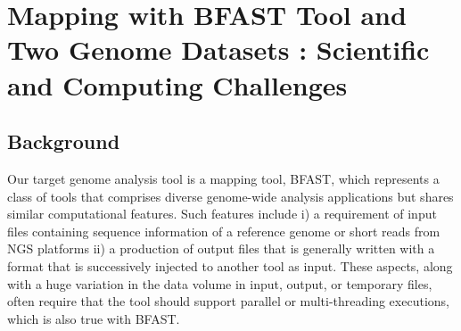 \documentclass[12pt]{article}
\begin{document}


\section{Mapping with BFAST Tool and Two Genome Datasets : Scientific and Computing Challenges}
\subsection{Background}

Our target genome analysis tool is a mapping tool, BFAST\cite{bfast2009,bfast2009b}, which represents a class of tools that comprises diverse genome-wide analysis applications but shares similar computational features.  Such features include i) a requirement of input files containing sequence information of a reference genome or short reads from NGS platforms ii) a production of output files that is generally written with a format that is successively injected to another tool as input.  These aspects, along with a huge variation in the data volume in input, output, or temporary files, often require that the tool should support parallel or multi-threading executions, which is also true with BFAST\cite{bfast2009}.  
\end{document}
